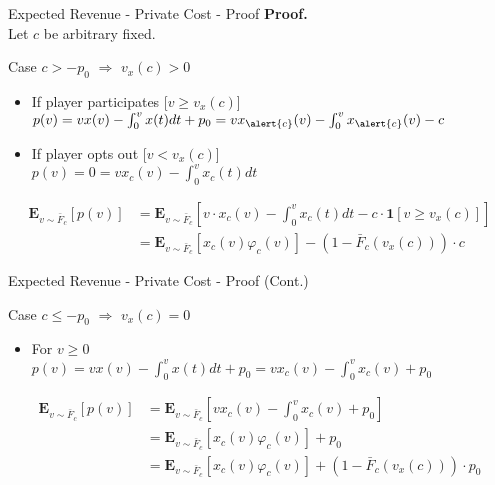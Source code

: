\documentclass{beamer}
\begin{document}
\begin{frame}{Expected Revenue - Private Cost - Proof}
  \textbf{Proof.}\\

  Let $c$ be arbitrary fixed.

  Case $c > -p_0$ $\Rightarrow$ $v_x(c) > 0$ \\
  \begin{itemize}
    \item If player participates [$v \geq v_x(c)$]\\
          $p(v) = v x(v) - \int_0^vx(t)dt + p_0 = v x_{\alert{c}}(v) - \int_0^v x_{\alert{c}}(v) - c$ \\
    \item If player opts out [$v < v_x(c)$]\\
          $p(v) = 0 = v x_c(v) - \int_0^v x_c(t) dt$
  \end{itemize}

  \begin{align*}
    \mathbf{E}_{v \sim \bar{F}_c}\left[p(v)\right] & = \mathbf{E}_{v \sim \bar{F}_c}\left[v \cdot x_c(v) - \int_0^v x_c(t)dt - c \cdot \mathbf{1}\left[v \geq v_x(c)\right]\right] \\
                                                   & = \mathbf{E}_{v \sim \bar{F}_c}\left[x_c(v)\varphi_c(v)\right] - (1 - \bar{F}_c(v_x(c))) \cdot c
  \end{align*}

\end{frame}
\begin{frame}{Expected Revenue - Private Cost - Proof (Cont.)}

  Case $c \leq -p_0$ $\Rightarrow$ $v_x(c) = 0$ \\
  \begin{itemize}
    \item For $v \geq 0$\\
          $p(v) = v x(v) - \int_0^vx(t)dt + p_0 = v x_c(v) - \int_0^v x_c(v) + p_0$ \\
  \end{itemize}

  \begin{align*}
    \mathbf{E}_{v \sim \bar{F}_c}\left[p(v)\right] & = \mathbf{E}_{v \sim \bar{F}_c} \left[v x_c(v) - \int_0^v x_c(v) + p_0 \right]                     \\
                                                   & = \mathbf{E}_{v \sim \bar{F}_c}\left[x_c(v)\varphi_c(v)\right] + p_0                               \\
                                                   & = \mathbf{E}_{v \sim \bar{F}_c}\left[x_c(v)\varphi_c(v)\right] + (1 - \bar{F}_c(v_x(c))) \cdot p_0
  \end{align*}

\end{frame}
\end{document}
